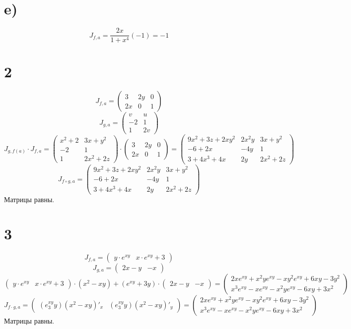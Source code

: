 	\section*{e)}
	$$J_{f,a} = \frac{2x}{1+x^4}(-1) = -1$$
	\section*{2}
	$$J_{f,a} = \begin{pmatrix}
		3 & 2y & 0 \\
		2x & 0 & 1
	\end{pmatrix}$$
	$$J_{g,a} = \begin{pmatrix}
		v & u \\
		-2 & 1 \\
		1 & 2v
	\end{pmatrix}$$
	$$J_{g,f(a)}\cdot J_{f,a} = \begin{pmatrix}
		x^2+2 & 3x+y^2\\
		-2 & 1 \\
		1 & 2x^2+2z
	\end{pmatrix}\cdot \begin{pmatrix}
	3 & 2y & 0\\
	2x & 0 & 1
	\end{pmatrix}= \begin{pmatrix}
		9x^2+3z+2xy^2 & 2x^2y & 3x+y^2\\
		-6+2x & -4y & 1 \\
		3+4x^3+4x & 2y & 2x^2+2z
	\end{pmatrix} $$
	$$J_{f\circ g,a} = \begin{pmatrix}
		9x^2+3z+2xy^2 & 2x^2y & 3x+y^2\\
		-6+2x & -4y & 1 \\
		3+4x^3+4x & 2y & 2x^2+2z
	\end{pmatrix}$$
	Матрицы равны. 
	\section*{3}
	$$J_{f,a} = \begin{pmatrix}
		y\cdot e^{xy} & x\cdot e^{xy} + 3
	\end{pmatrix}$$
		$$J_{g,a} = \begin{pmatrix}
		2x-y & -x
	\end{pmatrix}$$
	$$\begin{pmatrix}
		y\cdot e^{xy} & x\cdot e^{xy} + 3
	\end{pmatrix}\cdot(x^2-xy) + (e^{xy}+3y)\cdot\begin{pmatrix}
	2x-y & -x
	\end{pmatrix} = \begin{pmatrix}
	2xe^{xy}+x^2ye^{xy}-xy^2e^{xy}+6xy-3y^2 \\
	x^3e^{xy}-xe^{xy}-x^2ye^{xy}-6xy+3x^2
	\end{pmatrix}$$
	$$J_{f\cdot g, a} = \begin{pmatrix}
		(e^{xy}_3y)(x^2-xy)'_{x} & (e^{xy}_3y)(x^2-xy)'_{y}
	\end{pmatrix}  = \begin{pmatrix}
	2xe^{xy}+x^2ye^{xy}-xy^2e^{xy}+6xy-3y^2 \\
	x^3e^{xy}-xe^{xy}-x^2ye^{xy}-6xy+3x^2
	\end{pmatrix}$$
	Матрицы равны. 
